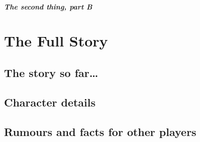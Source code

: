 \lipsum[5]

\subsubsection{The second thing, part B}

\lipsum[6-9]

\part{The Full Story}

\chapter{The story so far\ldots}



\chapter{Character details}

\lipsum[7]

\chapter{Rumours and facts for other players}

\lipsum[8]


